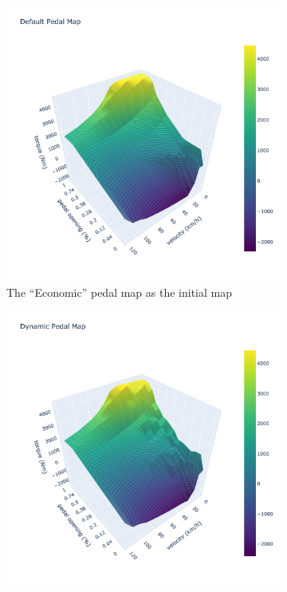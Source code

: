 \documentclass{article}
\begin{document}
\begin{figure}[ht]
	\centering
	\begin{subfigure}[b]{0.45\textwidth}
		\centering
		\includegraphics[width=\textwidth]{images/table_init.png}
		\caption{The ``Economic'' pedal map as the initial map}\label{fig:initial pedal map}
	\end{subfigure}
	\hfill
	\begin{subfigure}[b]{0.45\textwidth}
		\centering
		\includegraphics[width=\textwidth]{images/table_final.png}

\end{subfigure}
\end{figure}
\end{document}
